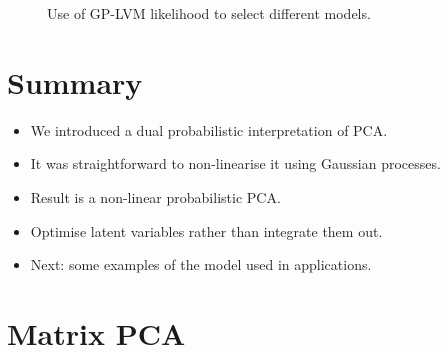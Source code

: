 %
\begin{figure}


\hfill{}


\hfill{}


\hfill{}\caption{Use of GP-LVM likelihood to select different models.}

\end{figure}



\section{Summary}
\begin{itemize}
\item We introduced a dual probabilistic interpretation of PCA.
\item It was straightforward to non-linearise it using Gaussian processes.
\item Result is a non-linear probabilistic PCA.
\item Optimise latent variables rather than integrate them out.
\item Next: some examples of the model used in applications.
\end{itemize}

\section{Matrix PCA}

